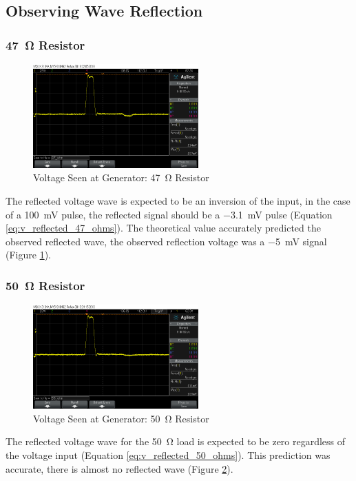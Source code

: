 \documentclass[conference]{IEEEtran}
\begin{document}
\subsection{Observing Wave Reflection}

\subsubsection{\SI{47}{\ohm} Resistor}

\begin{figure}[H]
  \centering
  \includegraphics[width=2.5in]{./img/47_ohm.png}
  \caption{Voltage Seen at Generator: \SI{47}{\ohm} Resistor}
  \label{fig:47_ohm}
\end{figure}

The reflected voltage wave is expected to be an inversion of the input, in the
case of a \SI{100}{\milli\volt} pulse, the reflected signal should be
a \SI{-3.1}{\milli\volt} pulse (Equation \ref{eq:v_reflected_47_ohms}). The
theoretical value accurately predicted the observed reflected wave, the observed
reflection voltage was a \SI{-5}{\milli\volt} signal (Figure \ref{fig:47_ohm}).


\subsubsection{\SI{50}{\ohm} Resistor}
\begin{figure}[H]
  \centering
  \includegraphics[width=2.5in]{./img/50_ohm.png}
  \caption{Voltage Seen at Generator: \SI{50}{\ohm} Resistor}
  \label{fig:50_ohm}
\end{figure}

The reflected voltage wave for the \SI{50}{\ohm} load is expected to be zero regardless of the voltage
input (Equation \ref{eq:v_reflected_50_ohms}). This prediction was accurate,
there is almost no reflected wave (Figure \ref{fig:50_ohm}).
\end{document}
